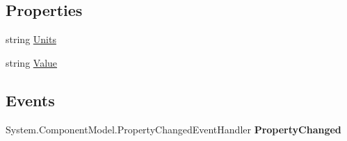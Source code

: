 \subsection*{Properties}
\begin{DoxyCompactItemize}
\item 
\hypertarget{class_price___comparison_1_1amazon_1_1ecs_1_1_non_negative_integer_with_units_a41156a40fcff342e2e2514b68eae6e07}{string \hyperlink{class_price___comparison_1_1amazon_1_1ecs_1_1_non_negative_integer_with_units_a41156a40fcff342e2e2514b68eae6e07}{Units}}\label{class_price___comparison_1_1amazon_1_1ecs_1_1_non_negative_integer_with_units_a41156a40fcff342e2e2514b68eae6e07}

\begin{DoxyCompactList}\small\item\em \end{DoxyCompactList}\item 
\hypertarget{class_price___comparison_1_1amazon_1_1ecs_1_1_non_negative_integer_with_units_a0c1fef15fe9dac737aa42711b41f9cd7}{string \hyperlink{class_price___comparison_1_1amazon_1_1ecs_1_1_non_negative_integer_with_units_a0c1fef15fe9dac737aa42711b41f9cd7}{Value}}\label{class_price___comparison_1_1amazon_1_1ecs_1_1_non_negative_integer_with_units_a0c1fef15fe9dac737aa42711b41f9cd7}

\begin{DoxyCompactList}\small\item\em \end{DoxyCompactList}\end{DoxyCompactItemize}
\subsection*{Events}
\begin{DoxyCompactItemize}
\item 
\hypertarget{class_price___comparison_1_1amazon_1_1ecs_1_1_non_negative_integer_with_units_a9d7789e4af7b3506fb6a9d55e6b6c89e}{System.\-Component\-Model.\-Property\-Changed\-Event\-Handler {\bfseries Property\-Changed}}\label{class_price___comparison_1_1amazon_1_1ecs_1_1_non_negative_integer_with_units_a9d7789e4af7b3506fb6a9d55e6b6c89e}

\end{DoxyCompactItemize}
